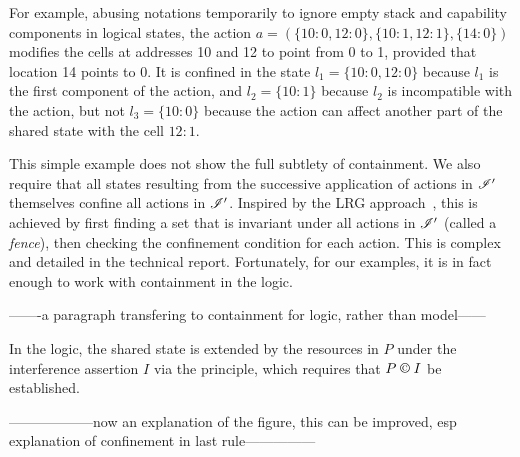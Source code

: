 
For example, 
abusing notations temporarily to ignore empty stack and
capability components in logical states, the action $a = (\{10:0,
12:0\}, \{10:1, 12:1\}, \{14:0\})$ 
 modifies the cells at addresses 10 and 12 to point from 0 to 1, 
 provided that location 14 points to 0.
It  is
confined in the state $l_1=\{10:0,12:0\}$ because $l_1$ is the first
component of the action, 
 and $l_2=\{10:1\}$ because $l_2$ is incompatible with the action, 
but not 
$l_3=\{10:0\}$ because the action can affect another part
of the shared state with the cell $12:1$. 

This simple example does not show the full subtlety of containment. We  also require that all states resulting from the successive
application of actions in $\mathscr{I}'$ themselves confine all actions in
$\mathscr{I}'$. 
Inspired by the LRG approach~\cite{lrg}, this is achieved by
first finding a set that is invariant under all actions in $\mathscr{I}'$
(called a \emph{fence}), then checking the confinement condition for
each action. This is complex and detailed in the technical
report. Fortunately, for our examples,  it is in fact enough to work with containment in the
logic. 

-------a paragraph transfering to containment for logic, rather than model------


In the logic, the shared state is extended by the resources in
$P$ under the interference assertion $I$ via the \extendRule principle,
which requires that $P\containI I$ be
established. 

------------------now an explanation of the figure, this can be
improved, esp explanation of  confinement in last rule---------------


